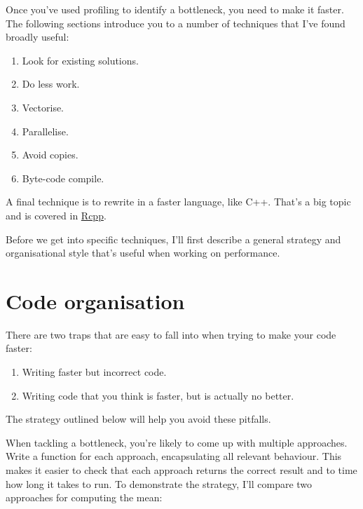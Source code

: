 Once you've used profiling to identify a bottleneck, you need to make it
faster. The following sections introduce you to a number of techniques
that I've found broadly useful: 

\begin{enumerate}
\def\labelenumi{\arabic{enumi}.}
\tightlist
\item
  Look for existing solutions.
\item
  Do less work.
\item
  Vectorise.
\item
  Parallelise.
\item
  Avoid copies.
\item
  Byte-code compile.
\end{enumerate}

A final technique is to rewrite in a faster language, like C++. That's a
big topic and is covered in \protect\hyperlink{rcpp}{Rcpp}.

Before we get into specific techniques, I'll first describe a general
strategy and organisational style that's useful when working on
performance.

\hypertarget{code-organisation}{%
\section{Code organisation}\label{code-organisation}}

There are two traps that are easy to fall into when trying to make your
code faster:

\begin{enumerate}
\def\labelenumi{\arabic{enumi}.}
\tightlist
\item
  Writing faster but incorrect code.
\item
  Writing code that you think is faster, but is actually no better.
\end{enumerate}

The strategy outlined below will help you avoid these pitfalls.

When tackling a bottleneck, you're likely to come up with multiple
approaches. Write a function for each approach, encapsulating all
relevant behaviour. This makes it easier to check that each approach
returns the correct result and to time how long it takes to run. To
demonstrate the strategy, I'll compare two approaches for computing the
mean:

\begin{Shaded}
\begin{Highlighting}[]
\StringTok{ }
\StringTok{ }\OperatorTok{/}\StringTok{ }
\end{Highlighting}
\end{Shaded}

